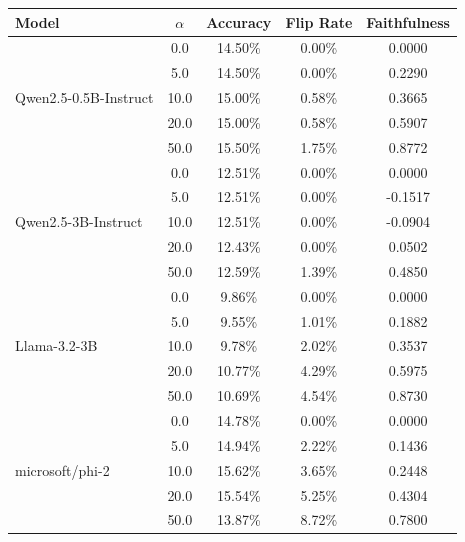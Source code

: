 \documentclass[preview, border=5mm]{standalone}
\begin{document}
\begin{minipage}{14cm}
    \centering
    \vspace{0.2cm}
    \begin{tabular}{l c c c c}
        \toprule
        \textbf{Model} & \textbf{$\alpha$} & \textbf{Accuracy} & \textbf{Flip Rate} & \textbf{Faithfulness} \\
        \midrule
        \multirow{5}{*}{Qwen2.5-0.5B-Instruct} 
        & 0.0 & 14.50\% & 0.00\% & 0.0000 \\
        & 5.0 & 14.50\% & 0.00\% & 0.2290 \\
        & 10.0 & 15.00\% & 0.58\% & 0.3665 \\
        & 20.0 & 15.00\% & 0.58\% & 0.5907 \\
        & 50.0 & 15.50\% & 1.75\% & 0.8772 \\
        \midrule
        \multirow{5}{*}{Qwen2.5-3B-Instruct} 
        & 0.0 & 12.51\% & 0.00\% & 0.0000 \\
        & 5.0 & 12.51\% & 0.00\% & -0.1517 \\
        & 10.0 & 12.51\% & 0.00\% & -0.0904 \\
        & 20.0 & 12.43\% & 0.00\% & 0.0502 \\
        & 50.0 & 12.59\% & 1.39\% & 0.4850 \\
        \midrule
        \multirow{5}{*}{Llama-3.2-3B} 
        & 0.0 & 9.86\% & 0.00\% & 0.0000 \\
        & 5.0 & 9.55\% & 1.01\% & 0.1882 \\
        & 10.0 & 9.78\% & 2.02\% & 0.3537 \\
        & 20.0 & 10.77\% & 4.29\% & 0.5975 \\
        & 50.0 & 10.69\% & 4.54\% & 0.8730 \\
        \midrule
        \multirow{5}{*}{microsoft/phi-2} 
        & 0.0 & 14.78\% & 0.00\% & 0.0000 \\
        & 5.0 & 14.94\% & 2.22\% & 0.1436 \\
        & 10.0 & 15.62\% & 3.65\% & 0.2448 \\
        & 20.0 & 15.54\% & 5.25\% & 0.4304 \\
        & 50.0 & 13.87\% & 8.72\% & 0.7800 \\
        \bottomrule
    \end{tabular}
\end{minipage}
\end{document}
